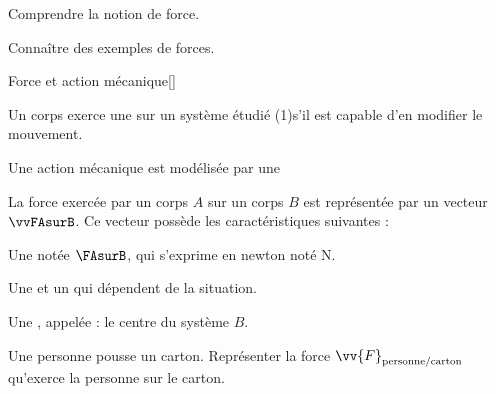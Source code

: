 \teteSndMouv

\vspace*{-32pt}

\begin{objectifs}
  \item Comprendre la notion de force.
  \item Connaître des exemples de forces.
\end{objectifs}

\begin{doc}{Force et action mécanique}[\label{doc:action_force}]
  \begin{importants}  
    Un corps exerce une  sur un système étudié \texteTrou(1){s’il est capable d’en modifier le mouvement.}
  \end{importants}
  
  Une action mécanique est modélisée par une 

  \begin{importants}
    La force exercée par un corps $A$ sur un corps $B$ est représentée par un vecteur $\vvFAsurB$.
    Ce vecteur possède les caractéristiques suivantes :
    \begin{listePoints}
      \item Une  notée $\FAsurB$, qui s'exprime en newton noté \unit{\newton}.
      \item Une  et un  qui dépendent de la situation.
      \item Une , appelée  : le centre du système $B$.
    \end{listePoints}
  \end{importants}
\end{doc}

\mesure
Une personne pousse un carton. 
Représenter la force $\vv{F}_\text{personne/carton}$ qu'exerce la personne sur le carton.

\vspace*{-8pt}
\begin{center}
\end{center}


